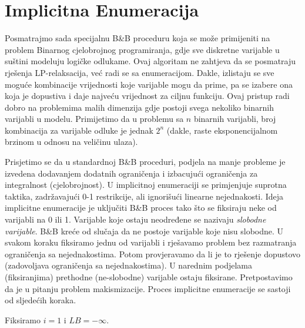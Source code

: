 \documentclass[a4paper, utf8, 11pt, colorlinks]{book}
\begin{document}
\section{Implicitna Enumeracija}
Posmatrajmo sada specijalnu B\&B proceduru koja se može primijeniti na problem Binarnog cjelobrojnog programiranja, gdje    sve diskretne varijable u suštini modeluju logičke odlukame. Ovaj algoritam ne zahtjeva da se posmatraju rješenja LP-relaksacija, već radi se sa enumeracijom. Dakle, izlistaju se sve moguće kombinacije vrijednosti koje varijable mogu da prime, pa se izabere ona koja je dopustiva i daje najveću vrijednost za ciljnu funkciju. Ovaj pristup radi dobro na problemima malih dimenzija gdje postoji svega nekoliko binarnih varijabli u modelu. Primijetimo da u problemu sa $n$ binarnih varijabli,  broj kombinacija za varijable odluke je jednak $2^n$ (dakle, raste eksponencijalnom brzinom u odnosu na veličinu ulaza). 

Prisjetimo se da u standardnoj B\&B proceduri, podjela na manje probleme je izvedena dodavanjem dodatnih ograničenja i izbacujući ograničenja za integralnost (cjelobrojnost). U implicitnoj enumeraciji se primjenjuje suprotna taktika, zadržavajući 0-1 restrikcije, ali ignorišući linearne nejednakosti. 
Ideja implicitne enumeracije je uključiti B\&B proces tako što se fiksiraju neke od varijabli na 0 ili 1. Varijable koje ostaju neodređene se nazivaju \emph{slobodne varijable}.  B\&B kreće od slučaja da ne postoje varijable koje nisu slobodne. U svakom koraku fiksiramo jednu od varijabli i rješavamo problem bez razmatranja ograničenja sa nejednakostima. Potom provjeravamo da li je to rješenje dopustovo (zadovoljava ograničenja sa nejednakostima). U narednim podjelama (fiksiranjima) prethodne (ne-slobodne) varijable ostaju fiksirane. 
Pretpostavimo da je u pitanju problem makismizacije. Proces implicitne enumeracije se sastoji od sljedećih koraka. 

Fiksiramo $i=1$ i $LB=-\infty$. 
\end{document}
